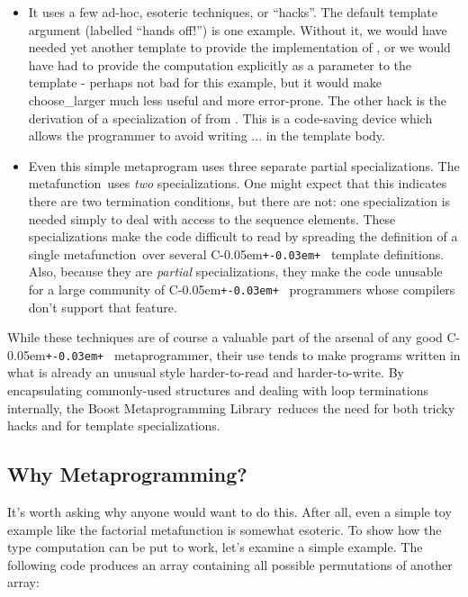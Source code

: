 \documentclass{netobjectdays}
\newcommand{\Cpp}{C\kern-0.05em\texttt{+\kern-0.03em+}%
}
\newcommand{\Mpl}{Boost Meta\-program\-ming Library}
\newcommand{\mpgmer}{meta\-program\-mer}
\newcommand{\mfn}{meta\-function}
\begin{document}
\begin{itemize}
\item It uses a few ad-hoc, esoteric techniques, or ``hacks''. The
  default template argument  (labelled ``hands off!'')
  is one example. Without it, we would have needed yet another
  template to provide the implementation of ,
  or we would have had to provide the computation explicitly as a
  parameter to the template - perhaps not bad for this example, but it
  would make choose\_\-larger much less useful and more
  error-prone. The other hack is the derivation of a specialization of
   from . This is a code-saving
  device which allows the programmer to avoid writing ... in the template body.

\item Even this simple metaprogram uses three separate partial
  specializations. The  \mfn\ uses \emph{two}
  specializations. One might expect that this indicates there are two
  termination conditions, but there are not: one specialization is
  needed simply to deal with access to the sequence elements. These
  specializations make the code difficult to read by spreading the
  definition of a single \mfn\ over several \Cpp\ template
  definitions. Also, because they are \emph{partial} specializations,
  they make the code unusable for a large community of \Cpp\
  programmers whose compilers don't support that feature.
\end{itemize}

While these techniques are of course a valuable part of the arsenal of
any good \Cpp\ \mpgmer, their use tends to make programs written in
what is already an unusual style harder-to-read and
harder-to-write. By encapsulating commonly-used structures and dealing
with loop terminations internally, the \Mpl\ reduces the need for both
tricky hacks and for template specializations.

\subsection{Why Metaprogramming?}


It's worth asking why anyone would want to do this. After all, even a
simple toy example like the factorial metafunction is somewhat
esoteric. To show how the type computation can be put to work, let's
examine a simple example. The following code produces an array
containing all possible permutations of another array:
\end{document}
